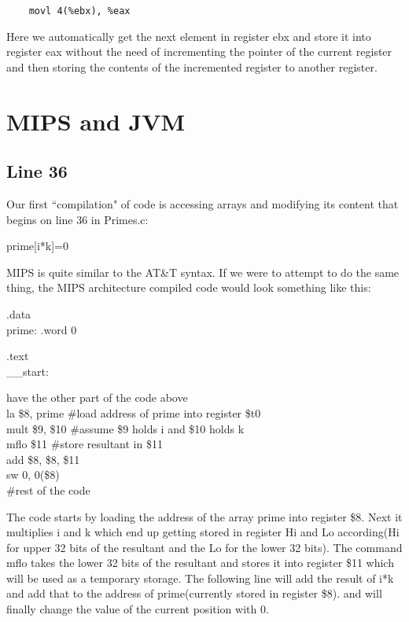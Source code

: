 \documentclass[11pt]{article}
\newenvironment{myindentpar}[1]
{\begin{list}{} 
{\setlength{\leftmargin}{#1}}\item[]}
{\end{list}}
\begin{document}
\begin{verbatim}
    movl 4(%ebx), %eax
\end{verbatim}

Here we automatically get the next element in register ebx and store it into register eax without the need of incrementing the pointer of the current register and then storing the contents of the incremented register to another register.

\section{MIPS and JVM}
\subsection{Line 36}
Our first ``compilation" of code is accessing arrays and modifying its content that begins on line 36 in Primes.c:

\hspace*{2.2 in} prime[i*k]=0

MIPS is quite similar to the AT\&T syntax. If we were to attempt to do the same thing, the MIPS architecture compiled code would look something like this:

.data
\\\hspace*{.4 in}prime: .word 0

.text
\\\_\_start:
\begin{myindentpar}{.4 in}
\#have the other part of the code above
\\la \$8, prime \#load address of prime into register \$t0
\\mult \$9, \$10 \#assume \$9 holds i and \$10 holds k
\\mflo \$11 \#store resultant in \$11
\\add \$8, \$8, \$11
\\sw 0, 0(\$8)\\
\#rest of the code
\end{myindentpar}

The code starts by loading the address of the array prime into register \$8. Next it multiplies i and k which end up getting stored in register Hi and Lo according(Hi for upper 32 bits of the resultant and the Lo for the lower 32 bits). The command mflo takes the lower 32 bits of the resultant and stores it into register \$11 which will be used as a temporary storage. The following line will add the result of i*k and add that to the address of prime(currently stored in register \$8). and will finally change the value of the current position with 0.
\end{document}
